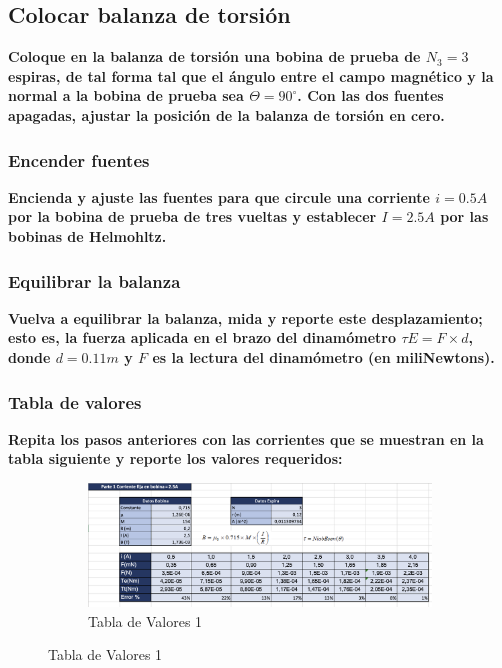 \subsection{Colocar balanza de torsión}
\textbf{Coloque en la balanza de torsión una bobina de prueba de $N_3 = 3$ espiras, de tal
forma tal que el ángulo entre el campo magnético y la normal a la bobina de prueba
sea $\Theta = 90^{\circ}$. Con las dos fuentes apagadas, ajustar la posición de la balanza de
torsión en cero.}

\subsubsection{Encender fuentes}
\textbf{Encienda y ajuste las fuentes para que circule una corriente $i = 0.5A$ por la
bobina de prueba de tres vueltas y establecer $I=2.5A$ por las bobinas de
Helmohltz.}
\subsubsection{Equilibrar la balanza}
\textbf{Vuelva a equilibrar la balanza, mida y reporte este desplazamiento; esto es,
la fuerza aplicada en el brazo del dinamómetro $\tau E = F \times d$, donde $d=0.11m$ y $F$ es la lectura del dinamómetro (en miliNewtons).}

\subsubsection{Tabla de valores}
\textbf{Repita los pasos anteriores con las corrientes que se muestran en la tabla
siguiente y reporte los valores requeridos:}

\begin{figure}[H]
  \centering
  \begin{subfigure}[b]{\textwidth}
      \centering
      \includegraphics[width=\textwidth]{Figures/1. Content/tabla1.png}
      \caption{Tabla de Valores 1}
      \label{fig: Tabla 1}
  \end{subfigure}
  \hfill
\end{figure}

